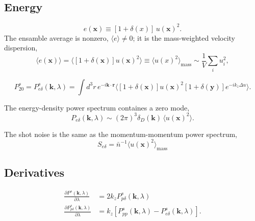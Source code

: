 \documentclass[a4paper,11pt, fleqn]{article}
\begin{document}
%
%
\vspace{5mm}
\subsection{Energy}

\begin{equation}
  e(\bm{x}) \equiv [ 1 + \delta(x) ] \, u(\bm{x})^2.
\end{equation}
%
The ensamble average is nonzero, $\langle e \rangle \neq 0 $; it is
the mass-weighted velocity dispersion,
%
\begin{equation}
  \langle e(\bm{x}) \rangle = \langle [ 1 + \delta(\bm{x})] u(\bm{x})^2 \rangle
  \equiv \langle u(x)^2 \rangle_\mathrm{mass} \sim \frac{1}{V}\sum_i u_i^2,
\end{equation}

\begin{equation}
  P^s_{20} = P^s_{e\delta}(\bm{k}, \lambda)
  = \int \! d^3r \, e^{-i\bm{k}\cdot\bm{r}} \Big\langle
    [ 1 + \delta(\bm{x}) ] u(\bm{x})^2 [ 1 + \delta(\bm{y}) ]
    e^{-ik_z \Delta u } \Big\rangle.
\end{equation}

The energy-density power spectrum containes a zero mode,
\begin{equation}
  P_{e\delta}(\bm{k}, \lambda)
  \sim (2\pi)^3 \delta_D(\bm{k}) \, \langle u(\bm{x})^2 \rangle.
\end{equation}

The shot noise is the same as the momentum-momentum power spectrum,
\begin{equation}
  S_{e\delta} = \bar{n}^{-1} \langle u(\bm{x})^2 \rangle_\mathrm{mass}
\end{equation}

%
%
\vspace{5mm}
\subsection{Derivatives}

\begin{align}
  \frac{\partial P^s(\bm{k}, \lambda)}{\partial \lambda}
  &= 2 k_z P^s_{p \delta}(\bm{k}, \lambda)\\
  \frac{\partial P_{p\delta}^s(\bm{k}, \lambda)}{\partial \lambda}
  &= k_z \left[ P^s_{pp}(\bm{k}, \lambda) - P^s_{e\delta}(\bm{k}, \lambda)
    \right].
\end{align}
\end{document}
